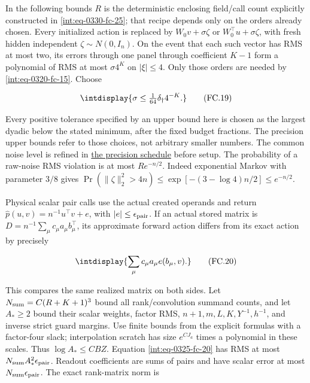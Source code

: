 In the following bounds \(R\) is the deterministic enclosing field/call count explicitly constructed in \eqref{int:eq-0330-fc-25}; that recipe depends only on the orders already chosen. Every initialized action is replaced by \(W_0v+\sigma\zeta\) or \(W_0^\top u+\sigma\zeta\), with fresh hidden independent \(\zeta\sim N(0,\allowbreak I_n)\). On the event that each such vector has RMS at most two, its errors through one panel through coefficient \(K-1\) form a polynomial of RMS at most \(\sigma4^K\) on \(|\xi|\le4\). Only those orders are needed by \eqref{int:eq-0320-fc-15}. Choose


\begingroup\renewcommand{\theHequation}{intdisplay.717}
\begin{equation}
\intdisplay{
\sigma\le\tfrac1{64}\delta_\dagger4^{-K}.
}
\tag{FC.19}
\label{int:eq-0324-fc-19}
\end{equation}
\endgroup


Every positive tolerance specified by an upper bound here is chosen as the largest dyadic below the stated minimum, after the fixed budget fractions. The precision upper bounds refer to those choices, not arbitrary smaller numbers. The common noise level is refined in \hyperref[int:decoder-precision-coupling]{the precision schedule} before setup. The probability of a raw-noise RMS violation is at most \(Re^{-n/2}\). Indeed exponential Markov with parameter \(3/8\) gives \(\Pr(\|\zeta\|_2^2>4n)\le \exp[-(3-\log4)n/2]\le e^{-n/2}\).



Physical scalar pair calls use the actual created operands and return \(\widehat p(u,\allowbreak v)=n^{-1}u^\top v+e\), with \(|e|\le\epsilon_{\rm pair}\). If an actual stored matrix is \(D=n^{-1}\sum_\mu c_\mu a_\mu b_\mu^\top\), its approximate forward action differs from its exact action by precisely


\begingroup\renewcommand{\theHequation}{intdisplay.718}
\begin{equation}
\intdisplay{
\sum_\mu c_\mu a_\mu e(b_\mu,v).
}
\tag{FC.20}
\label{int:eq-0325-fc-20}
\end{equation}
\endgroup


This compares the same realized matrix on both sides. Let \(N_{\rm sum}=C(R+K+1)^3\) bound all rank/convolution summand counts, and let \(A_\ast\ge2\) bound their scalar weights, factor RMS, \(n+1,\allowbreak m,\allowbreak L,\allowbreak K,\allowbreak Y^{-1},\allowbreak h^{-1}\), and inverse strict guard margins. Use finite bounds from the explicit formulas with a factor-four slack; interpolation scratch has size \(e^{CJ_a}\) times a polynomial in these scales. Thus \(\log A_\ast\le CBZ\). Equation \eqref{int:eq-0325-fc-20} has RMS at most \(N_{\rm sum}A_\ast^2\epsilon_{\rm pair}\). Readout coefficients are sums of pairs and have scalar error at most \(N_{\rm sum}\epsilon_{\rm pair}\). The exact rank-matrix norm is


